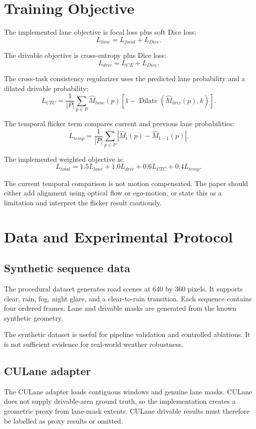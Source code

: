 \documentclass[11pt,a4paper]{article}
\begin{document}
\section{Training Objective}

The implemented lane objective is focal loss plus soft Dice loss:
\[
L_{lane}=L_{focal}+L_{Dice}.
\]

The drivable objective is cross-entropy plus Dice loss:
\[
L_{driv}=L_{CE}+L_{Dice}.
\]

The cross-task consistency regularizer uses the predicted lane probability and a dilated drivable probability:
\[
L_{CTC}=\frac{1}{|P|}\sum_{p\in P} \hat{M}_{lane}(p)\left[1-\operatorname{Dilate}(\hat{M}_{driv}(p),k)\right].
\]

The temporal flicker term compares current and previous lane probabilities:
\[
L_{temp}=\frac{1}{|P|}\sum_{p\in P}|\hat{M}_{t}(p)-\hat{M}_{t-1}(p)|.
\]

The implemented weighted objective is:
\[
L_{total}=1.5L_{lane}+1.0L_{driv}+0.6L_{CTC}+0.4L_{temp}.
\]

The current temporal comparison is not motion compensated. The paper should either add alignment using optical flow or ego-motion, or state this as a limitation and interpret the flicker result cautiously.

\section{Data and Experimental Protocol}

\subsection{Synthetic sequence data}
The procedural dataset generates road scenes at 640 by 360 pixels. It supports clear, rain, fog, night glare, and a clear-to-rain transition. Each sequence contains four ordered frames. Lane and drivable masks are generated from the known synthetic geometry.

The synthetic dataset is useful for pipeline validation and controlled ablations. It is not sufficient evidence for real-world weather robustness.

\subsection{CULane adapter}
The CULane adapter loads contiguous windows and genuine lane masks. CULane does not supply drivable-area ground truth, so the implementation creates a geometric proxy from lane-mask extents. CULane drivable results must therefore be labelled as proxy results or omitted.
\end{document}
